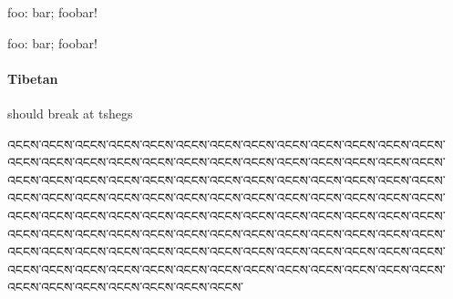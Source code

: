 foo: bar; foobar!

\begin{french}foo: bar; foobar!\end{french}

\paragraph{Tibetan}should break at tshegs

\begin{tibetan}\raggedright
འངངས་འངངས་འངངས་འངངས་འངངས་འངངས་འངངས་འངངས་འངངས་འངངས་འངངས་འངངས་འངངས་འངངས་འངངས་འངངས་འངངས་འངངས་འངངས་འངངས་འངངས་འངངས་འངངས་འངངས་འངངས་འངངས་འངངས་འངངས་འངངས་འངངས་འངངས་འངངས་འངངས་འངངས་འངངས་འངངས་འངངས་འངངས་འངངས་འངངས་འངངས་འངངས་འངངས་འངངས་འངངས་འངངས་འངངས་འངངས་འངངས་འངངས་འངངས་འངངས་འངངས་འངངས་འངངས་འངངས་འངངས་འངངས་འངངས་འངངས་འངངས་འངངས་འངངས་འངངས་འངངས་འངངས་འངངས་འངངས་འངངས་འངངས་འངངས་འངངས་འངངས་འངངས་འངངས་འངངས་འངངས་འངངས་འངངས་འངངས་འངངས་འངངས་འངངས་འངངས་འངངས་འངངས་འངངས་འངངས་འངངས་འངངས་འངངས་འངངས་འངངས་འངངས་འངངས་འངངས་འངངས་འངངས་འངངས་འངངས་འངངས་འངངས་འངངས་འངངས་འངངས་འངངས་འངངས་འངངས་འངངས་འངངས་འངངས་

\end{tibetan}

